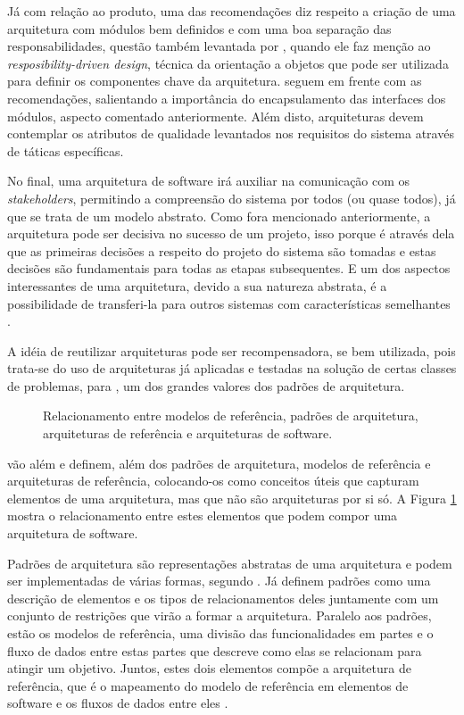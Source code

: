 \documentclass[diss]{template/setrem}
\begin{document}
Já com relação ao produto, uma das recomendações diz respeito a criação de uma arquitetura com módulos bem definidos e com uma boa separação das responsabilidades, questão também levantada por \citet{Gorton2011}, quando ele faz menção ao \emph{resposibility-driven design}, técnica da orientação a objetos que pode ser utilizada para definir os componentes chave da arquitetura. \citet{Bass2003} seguem em frente com as recomendações, salientando a importância do encapsulamento das interfaces dos módulos, aspecto comentado anteriormente. Além disto, arquiteturas devem contemplar os atributos de qualidade levantados nos requisitos do sistema através de táticas específicas.

No final, uma arquitetura de software irá auxiliar na comunicação com os \emph{stakeholders}, permitindo a compreensão do sistema por todos (ou quase todos), já que se trata de um modelo abstrato. Como fora mencionado anteriormente, a arquitetura pode ser decisiva no sucesso de um projeto, isso porque é através dela que as primeiras decisões a respeito do projeto do sistema são tomadas e estas decisões são fundamentais para todas as etapas subsequentes. E um dos aspectos interessantes de uma arquitetura, devido a sua natureza abstrata, é a possibilidade de transferi-la para outros sistemas com características semelhantes \citep{Bass2003}.

A idéia de reutilizar arquiteturas pode ser recompensadora, se bem utilizada, pois trata-se do uso de arquiteturas já aplicadas e testadas na solução de certas classes de problemas, para \citet{Gorton2011}, um dos grandes valores dos padrões de arquitetura.

\begin{figure}[!h]
    \caption{Relacionamento entre modelos de referência, padrões de arquitetura, arquiteturas de referência e arquiteturas de software.}
    \label{fig:architecture-elements}
\end{figure}

\citet{Bass2003} vão além e definem, além dos padrões de arquitetura, modelos de referência e arquiteturas de referência, colocando-os como conceitos úteis que capturam elementos de uma arquitetura, mas que não são arquiteturas por si só. A Figura \ref{fig:architecture-elements} mostra o relacionamento entre estes elementos que podem compor uma arquitetura de software.

Padrões de arquitetura são representações abstratas de uma arquitetura e podem ser implementadas de várias formas, segundo \citet{Gorton2011}. Já \citet{Bass2003} definem padrões como uma descrição de elementos e os tipos de relacionamentos deles juntamente com um conjunto de restrições que virão a formar a arquitetura. Paralelo aos padrões, estão os modelos de referência, uma divisão das funcionalidades em partes e o fluxo de dados entre estas partes que descreve como elas se relacionam para atingir um objetivo. Juntos, estes dois elementos compõe a arquitetura de referência, que é o mapeamento do modelo de referência em elementos de software e os fluxos de dados entre eles \citep{Bass2003}.
\end{document}
